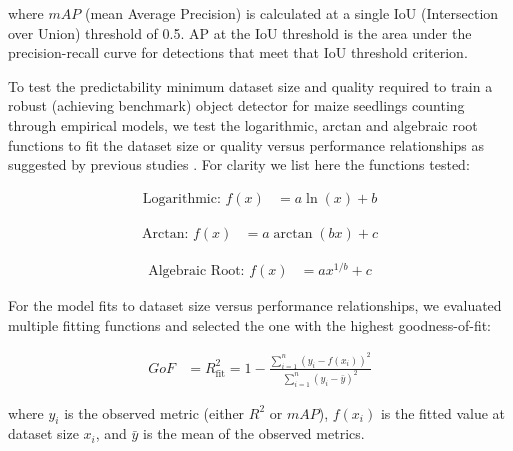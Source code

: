 \documentclass[12pt,a4paper,oneside]{report}
\begin{document}
where $mAP$ (mean Average Precision) is calculated at a single IoU (Intersection over Union) 
threshold of 0.5.
AP at the IoU threshold is the area under the precision-recall curve for detections 
that meet that IoU threshold criterion.

To test the predictability minimum dataset size and quality required to train a robust
(achieving benchmark) object detector for maize seedlings counting through empirical 
models, we test the logarithmic, arctan and algebraic root functions to fit the 
dataset size or quality versus performance relationships as suggested by previous
studies \cite{mahmoodHowMuchMore2022}. 
For clarity we list here the functions tested:


\begin{align}
\text{Logarithmic: } f(x) &= a \ln(x) + b
\end{align}

\begin{align}
\text{Arctan: } f(x) &= a \arctan(bx) + c
\end{align}

\begin{align}
\text{Algebraic Root: } f(x) &= a x^{1/b} + c
\end{align}

For the model fits to dataset size versus performance relationships, we evaluated 
multiple fitting functions and selected the one with the highest goodness-of-fit:

\begin{align}
\text{$GoF$} &= R^2_{\text{fit}} = 1 - \frac{\sum_{i=1}^{n} (y_i - f(x_i))^2}{\sum_{i=1}^{n} (y_i - \bar{y})^2}
\end{align}

where $y_i$ is the observed metric (either $R^2$ or $mAP$), $f(x_i)$ is the 
fitted value at dataset size $x_i$, and $\bar{y}$ is the mean of the observed 
metrics.
\end{document}
